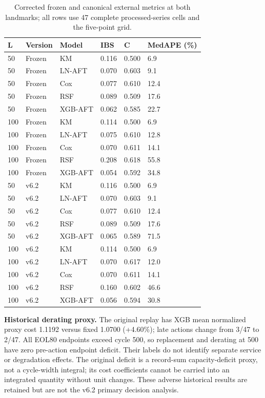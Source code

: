 \documentclass[10pt,a4paper]{article}
\begin{document}
\begin{table}[H]\centering\scriptsize
\caption{Corrected frozen and canonical external metrics at both landmarks; all rows use 47 complete processed-series cells and the five-point grid.}\label{tab:S8}
\begin{tabular*}{\linewidth}{@{\extracolsep{\fill}}llllll}\toprule
L & Version & Model & IBS & C & MedAPE (\%)\\\midrule
50 & Frozen & KM & 0.116 & 0.500 & 6.9\\
50 & Frozen & LN-AFT & 0.070 & 0.603 & 9.1\\
50 & Frozen & Cox & 0.077 & 0.610 & 12.4\\
50 & Frozen & RSF & 0.089 & 0.509 & 17.6\\
50 & Frozen & XGB-AFT & 0.062 & 0.585 & 22.7\\
100 & Frozen & KM & 0.114 & 0.500 & 6.9\\
100 & Frozen & LN-AFT & 0.075 & 0.610 & 12.8\\
100 & Frozen & Cox & 0.070 & 0.611 & 14.1\\
100 & Frozen & RSF & 0.208 & 0.618 & 55.8\\
100 & Frozen & XGB-AFT & 0.054 & 0.592 & 34.8\\
50 & v6.2 & KM & 0.116 & 0.500 & 6.9\\
50 & v6.2 & LN-AFT & 0.070 & 0.603 & 9.1\\
50 & v6.2 & Cox & 0.077 & 0.610 & 12.4\\
50 & v6.2 & RSF & 0.089 & 0.509 & 17.6\\
50 & v6.2 & XGB-AFT & 0.065 & 0.589 & 71.5\\
100 & v6.2 & KM & 0.114 & 0.500 & 6.9\\
100 & v6.2 & LN-AFT & 0.070 & 0.617 & 12.0\\
100 & v6.2 & Cox & 0.070 & 0.611 & 14.1\\
100 & v6.2 & RSF & 0.160 & 0.602 & 46.6\\
100 & v6.2 & XGB-AFT & 0.056 & 0.594 & 30.8\\
\bottomrule\end{tabular*}\end{table}

\textbf{Historical derating proxy.} The original replay has XGB mean normalized proxy cost 1.1192 versus fixed 1.0700 (+4.60\%); late actions change from 3/47 to 2/47. All EOL80 endpoints exceed cycle 500, so replacement and derating at 500 have zero pre-action endpoint deficit. Their labels do not identify separate service or degradation effects. The original deficit is a record-sum capacity-deficit proxy, not a cycle-width integral; its cost coefficients cannot be carried into an integrated quantity without unit changes. These adverse historical results are retained but are not the v6.2 primary decision analysis.
\end{document}
